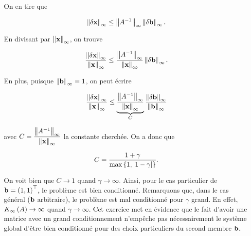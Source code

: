 On en tire que 

\begin{equation*}
  \left\lVert\delta \mathbf{x}\right\rVert_{\infty}
  \leq \left\lVert A^{-1}\right\rVert_{\infty} \left\lVert\delta \mathbf{b}\right\rVert_{\infty}.
\end{equation*}

En divisant par $\left\lVert\mathbf{x}\right\rVert_{\infty}$, on trouve 

\begin{equation*}
  \dfrac{\left\lVert\delta \mathbf{x}\right\rVert_{\infty}}{\left\lVert\mathbf{x}\right\rVert_{\infty}}
  \leq \dfrac{\left\lVert A^{-1}\right\rVert_{\infty}}{\left\lVert\mathbf{x}\right\rVert_{\infty}} \left\lVert\delta \mathbf{b}\right\rVert_{\infty}.
\end{equation*}

En plus, puisque $\left\lVert\mathbf{b}\right\rVert_{\infty} = 1$, on peut écrire

\begin{equation*}
  \dfrac{\left\lVert\delta \mathbf{x}\right\rVert_{\infty}}{\left\lVert\mathbf{x}\right\rVert_{\infty}}
  \leq \underbrace{\dfrac{\left\lVert A^{-1}\right\rVert_{\infty}}{\left\lVert\mathbf{x}\right\rVert_{\infty}}}_\text{$C$}
  \dfrac{\left\lVert\delta \mathbf{b}\right\rVert_{\infty}}{\left\lVert\mathbf{b}\right\rVert_{\infty}}
\end{equation*}

avec $C = \dfrac{\left\lVert A^{-1}\right\rVert_{\infty}}{\left\lVert\mathbf{x}\right\rVert_{\infty}}$ la constante cherchée.
On a donc que 

\begin{equation*}
  C = \dfrac{1 + \gamma}{\max \left\{1, \left\lvert1 - \gamma\right\rvert\right\}}.
\end{equation*}

On voit bien que $C \rightarrow 1$ quand $\gamma \rightarrow \infty$.
Ainsi, pour le cas particulier de $\mathbf{b} = \left(1, 1\right)^{\top}$, le problème est bien conditionné.
Remarquons que, dans le cas général ($\mathbf{b}$ arbitraire), le problème est mal conditionné pour $\gamma$ grand.
En effet, $K_{\infty} \left(A\right) \rightarrow \infty$ quand $\gamma \rightarrow \infty$.
Cet exercice met en évidence que le fait d'avoir une matrice avec un grand conditionnement n'empêche pas nécessairement le système global d'être bien conditionné pour des choix particuliers du second membre $\mathbf{b}$.











